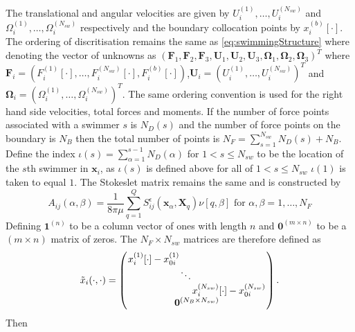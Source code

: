 The translational and angular velocities are given by $U_i^{(1)},\dots,U_i^{(N_{sw})}$ and $\Omega_i^{(1)},\dots,\Omega_i^{(N_{sw})}$ respectively and the boundary collocation points by $x_i^{(b)}[\cdot]$. The ordering of discritisation remains the same as \cref{eq:swimmingStructure} where denoting the vector of unknowns as \newline $(\bm{F}_1, \bm{F}_2, \bm{F}_3, \bm{U}_1,\bm{U}_2,\bm{U}_3,\bm{\Omega}_1,\bm{\Omega}_2,\bm{\Omega}_3)^T$ where $\bm{F}_i = (F_i^{(1)}[\cdot],\dots,F_i^{(N_{sw})}[\cdot],F_i^{(b)}[\cdot])$,\newline $\bm{U}_i = (U_i^{(1)},\dots,U_i^{(N_{sw})})^T$ and $\bm{\Omega}_i = (\Omega_i^{(1)},\dots,\Omega_i^{(N_{sw})})^T$. The same ordering convention is used for the right hand side velocities, total forces and moments. If the number of force points associated with a swimmer $s$ is $N_{D}(s)$ and the number of force points on the boundary is $N_B$ then the total number of points is $N_F=\sum_{s=1}^{N_{sw}} N_D(s) + N_B$. Define the index $\iota(s)=\sum_{\alpha=1}^{s-1}N_D(\alpha)$ for $1<s\leq N_{sw}$ to be the location of the $s$th swimmer in $\bm{x}_i$, as $\iota(s)$ is defined above for all of $1<s\leq N_{sw}$ $\iota(1)$ is taken to equal $1$. The Stokeslet matrix remains the same and is constructed by
\begin{equation*}
    A_{ij}(\alpha,\beta) = \frac{1}{8\pi\mu} \sum_{q=1}^Q S_{ij}^\epsilon (\bm{x}_\alpha,\bm{X}_{q})\nu[q,\beta] \text { for } \alpha,\beta = 1,\dots,N_F
\end{equation*}
Defining $\bm{1}^{(n)}$ to be a column vector of ones with length $n$ and $\bm{0}^{(m\times n)}$ to be a $(m\times n)$ matrix of zeros. The $N_F \times N_{sw}$ matrices are therefore defined as
\begin{equation*}
\arraycolsep=0.4pt\def\arraystretch{1}
    \tilde{x}_i(\cdot,\cdot)=\left(\begin{array}{c}
         \begin{array}{ccc}
             x_i^{(1)}[\cdot]-x_{0i}^{(1)} & & \\
              & \ddots & \\
              & & x_i^{(N_{sw})}[\cdot]-x_{0i}^{(N_{sw})}
         \end{array}\\
         \bm{0}^{(N_B \times N_{sw})}
    \end{array}\right).
\end{equation*}
Then
